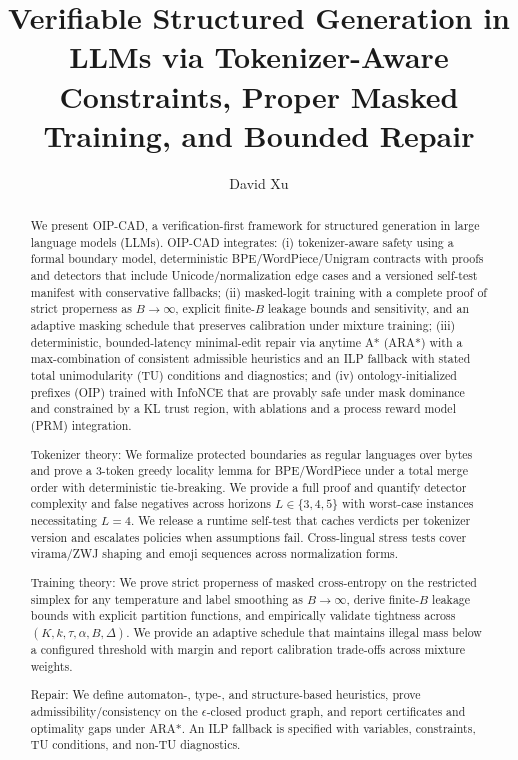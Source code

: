 \documentclass{article}
\title{Verifiable Structured Generation in LLMs via Tokenizer-Aware Constraints, Proper Masked Training, and Bounded Repair}
\author[1]{David Xu}
\affil[1]{China Mobile Research Institute}
\date{}
\begin{document}
\maketitle

\begin{abstract}
We present OIP-CAD, a verification-first framework for structured generation in large language models (LLMs). OIP-CAD integrates: (i) tokenizer-aware safety using a formal boundary model, deterministic BPE/WordPiece/Unigram contracts with proofs and detectors that include Unicode/normalization edge cases and a versioned self-test manifest with conservative fallbacks; (ii) masked-logit training with a complete proof of strict properness as $B\to\infty$, explicit finite-$B$ leakage bounds and sensitivity, and an adaptive masking schedule that preserves calibration under mixture training; (iii) deterministic, bounded-latency minimal-edit repair via anytime A* (ARA*) with a max-combination of consistent admissible heuristics and an ILP fallback with stated total unimodularity (TU) conditions and diagnostics; and (iv) ontology-initialized prefixes (OIP) trained with InfoNCE that are provably safe under mask dominance and constrained by a KL trust region, with ablations and a process reward model (PRM) integration.

Tokenizer theory: We formalize protected boundaries as regular languages over bytes and prove a 3-token greedy locality lemma for BPE/WordPiece under a total merge order with deterministic tie-breaking. We provide a full proof and quantify detector complexity and false negatives across horizons $L\in\{3,4,5\}$ with worst-case instances necessitating $L=4$. We release a runtime self-test that caches verdicts per tokenizer version and escalates policies when assumptions fail. Cross-lingual stress tests cover virama/ZWJ shaping and emoji sequences across normalization forms.

Training theory: We prove strict properness of masked cross-entropy on the restricted simplex for any temperature and label smoothing as $B\to\infty$, derive finite-$B$ leakage bounds with explicit partition functions, and empirically validate tightness across $(K,k,\tau,\alpha,B,\Delta)$. We provide an adaptive schedule that maintains illegal mass below a configured threshold with margin and report calibration trade-offs across mixture weights.

Repair: We define automaton-, type-, and structure-based heuristics, prove admissibility/consistency on the $\epsilon$-closed product graph, and report certificates and optimality gaps under ARA*. An ILP fallback is specified with variables, constraints, TU conditions, and non-TU diagnostics.


\end{abstract}
\end{document}
